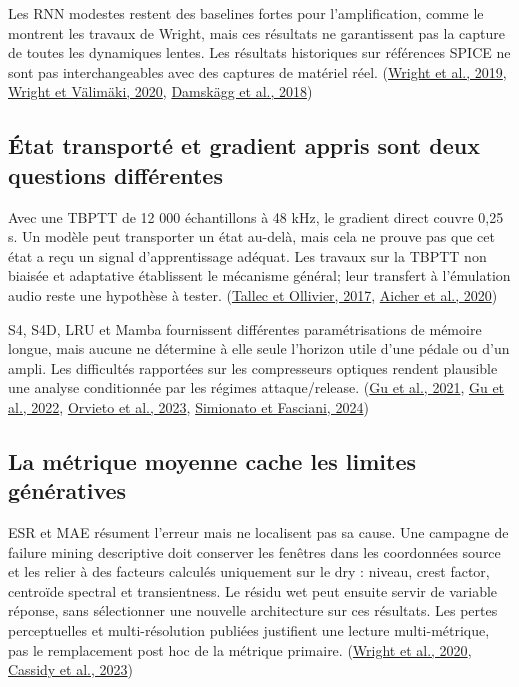 \documentclass[10pt,a4paper]{article}
\begin{document}
Les RNN modestes restent des baselines fortes pour l'amplification, comme le
montrent les travaux de Wright, mais ces r\'{e}sultats ne garantissent pas la capture
de toutes les dynamiques lentes. Les r\'{e}sultats historiques sur r\'{e}f\'{e}rences SPICE
ne sont pas interchangeables avec des captures de mat\'{e}riel r\'{e}el.
(\href{https://dafx.de/paper-archive/details/tieFMcaohHBxl_2yPyIGFA}{Wright et al., 2019},
\href{https://aaltodoc.aalto.fi/items/dc06100e-514d-41b4-b6b4-272912e872b7}{Wright et V\"{a}lim\"{a}ki, 2020},
\href{https://arxiv.org/abs/1811.00334}{Damsk\"{a}gg et al., 2018})

\subsection{\'{E}tat transport\'{e} et gradient appris sont deux questions diff\'{e}rentes}

Avec une TBPTT de 12 000 \'{e}chantillons \`{a} 48 kHz, le gradient direct couvre 0,25 s.
Un mod\`{e}le peut transporter un \'{e}tat au-del\`{a}, mais cela ne prouve pas que cet \'{e}tat
a re\c{c}u un signal d'apprentissage ad\'{e}quat. Les travaux sur la TBPTT non biais\'{e}e et
adaptative \'{e}tablissent le m\'{e}canisme g\'{e}n\'{e}ral; leur transfert \`{a} l'\'{e}mulation audio
reste une hypoth\`{e}se \`{a} tester.
(\href{https://arxiv.org/abs/1705.08209}{Tallec et Ollivier, 2017},
\href{https://proceedings.mlr.press/v115/aicher20a.html}{Aicher et al., 2020})

S4, S4D, LRU et Mamba fournissent diff\'{e}rentes param\'{e}trisations de m\'{e}moire longue,
mais aucune ne d\'{e}termine \`{a} elle seule l'horizon utile d'une p\'{e}dale ou d'un ampli.
Les difficult\'{e}s rapport\'{e}es sur les compresseurs optiques rendent plausible une
analyse conditionn\'{e}e par les r\'{e}gimes attaque/release.
(\href{https://arxiv.org/abs/2111.00396}{Gu et al., 2021},
\href{https://arxiv.org/abs/2206.11893}{Gu et al., 2022},
\href{https://arxiv.org/abs/2303.06349}{Orvieto et al., 2023},
\href{https://arxiv.org/abs/2408.12549}{Simionato et Fasciani, 2024})

\subsection{La m\'{e}trique moyenne cache les limites g\'{e}n\'{e}ratives}

ESR et MAE r\'{e}sument l'erreur mais ne localisent pas sa cause. Une campagne de
failure mining descriptive doit conserver les fen\^{e}tres dans les coordonn\'{e}es
source et les relier \`{a} des facteurs calcul\'{e}s uniquement sur le dry : niveau,
crest factor, centro\"{i}de spectral et transientness. Le r\'{e}sidu wet peut ensuite
servir de variable r\'{e}ponse, sans s\'{e}lectionner une nouvelle architecture sur ces
r\'{e}sultats. Les pertes perceptuelles et multi-r\'{e}solution publi\'{e}es justifient une
lecture multi-m\'{e}trique, pas le remplacement post hoc de la m\'{e}trique primaire.
(\href{https://dihana.cps.unizar.es/proceedings/ICASSP/2020/pdfs/0000251.pdf}{Wright et al., 2020},
\href{https://www.dafx.de/paper-archive/2023/DAFx23_paper_40.pdf}{Cassidy et al., 2023})
\end{document}

